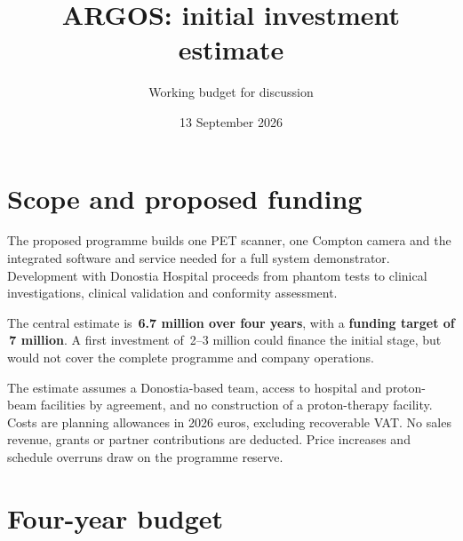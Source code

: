 \documentclass[11pt,a4paper]{article}
\title{ARGOS: initial investment estimate}
\author{Working budget for discussion}
\date{13 September 2026}
\begin{document}
\maketitle

\section{Scope and proposed funding}

The proposed programme builds one PET scanner, one Compton camera and the
integrated software and service needed for a full system demonstrator.
Development with Donostia Hospital proceeds from phantom tests to clinical
investigations, clinical validation and conformity assessment.

The central estimate is \textbf{\EUR\,6.7 million over four years}, with a
\textbf{funding target of \EUR\,7 million}. A first investment of
\EUR\,2--3 million could finance the initial stage, but would not cover the
complete programme and company operations.

The estimate assumes a Donostia-based team, access to hospital and proton-beam
facilities by agreement, and no construction of a proton-therapy facility.
Costs are planning allowances in 2026 euros, excluding recoverable VAT.
No sales revenue, grants or partner contributions are deducted. Price increases
and schedule overruns draw on the programme reserve.

\section{Four-year budget}
\end{document}
